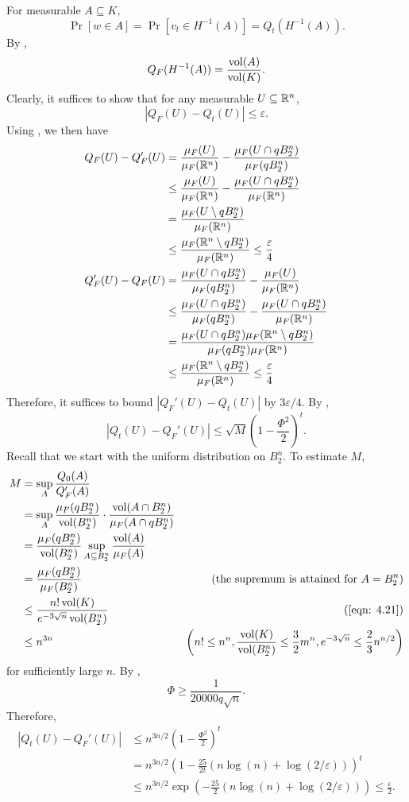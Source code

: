 For measurable $A\subseteq K$,
\[ \Pr[w\in A] = \Pr[v_t \in H^{-1}(A)] = Q_t(H^{-1}(A)). \]
By ,
\[ Q_F(H^{-1}(A)) = \frac{\operatorname{vol}(A)}{\operatorname{vol}(K)}. \]
Clearly, it suffices to show that for any measurable $U\subseteq\mathbb{R}^n$,
\[ |Q_F(U) - Q_t(U)| \leq \varepsilon. \]
Using , we then have
\begin{align*}
	Q_F(U) - Q_F'(U) &= \frac{\mu_F(U)}{\mu_F(\mathbb{R}^n)} - \frac{\mu_F(U\cap q B_2^n)}{\mu_F(q B_2^n)}  \\
		&\leq \frac{\mu_F(U)}{\mu_F(\mathbb{R}^n)} - \frac{\mu_F(U\cap q B_2^n)}{\mu_F(\mathbb{R}^n)} \\
		&= \frac{\mu_F(U\setminus qB_2^n)}{\mu_F(\mathbb{R}^n)} \\
		&\leq \frac{\mu_F(\mathbb{R}^n\setminus qB_2^n)}{\mu_F(\mathbb{R}^n)} \leq \frac{\varepsilon}{4} \\
	Q_F'(U) - Q_F(U) &= \frac{\mu_F(U\cap q B_2^n)}{\mu_F(q B_2^n)} - \frac{\mu_F(U)}{\mu_F(\mathbb{R}^n)} \\
		&\leq \frac{\mu_F(U\cap q B_2^n)}{\mu_F(qB_2^n)} - \frac{\mu_F(U\cap q B_2^n)}{\mu_F(\mathbb{R}^n)} \\
		&= \frac{\mu_F(U\cap q B_2^n)\mu_F(\mathbb{R}^n\setminus qB_2^n)}{\mu_F(qB_2^n)\mu_F(\mathbb{R}^n)} \\
		&\leq \frac{\mu_F(\mathbb{R}^n\setminus qB_2^n)}{\mu_F(\mathbb{R}^n)} \leq \frac{\varepsilon}{4}
\end{align*}
Therefore, it suffices to bound $|Q_F'(U)-Q_t(U)|$ by $3\varepsilon/4$. By ,
\[ |Q_t(U) - Q_F'(U)| \leq \sqrt{M}\left(1-\frac{\Phi^2}{2}\right)^t. \]
Recall that we start with the uniform distribution on $B_2^n$. To estimate $M$,
\begin{align*}
	M 	&= \sup_{A} \frac{Q_0(A)}{Q_F'(A)} \\
		&= \sup_{A} \frac{\mu_F(q B_2^n)}{\vol(B_2^n)}\cdot\frac{\vol(A\cap B_2^n)}{\mu_F(A\cap q B_2^n)} \\
		&= \frac{\mu_F(q B_2^n)}{\vol(B_2^n)} \sup_{A\subseteq B_2^n}\frac{\vol(A)}{\mu_F(A)} \\
		&= \frac{\mu_F(q B_2^n)}{\mu_F(B_2^n)} & (\text{the supremum is attained for }A=B_2^n) \\
		&\leq \frac{n!\vol(K)}{e^{-3\sqrt{n}}\vol(B_2^n)} & (\text{\Cref{eqn: 4.21}}) \\
		&\leq n^{3n} & \left(n!\leq n^n, \frac{\vol(K)}{\vol(B_2^n)} \leq \frac{3}{2}m^n, e^{-3\sqrt{n}}\leq\frac{2}{3}n^{n/2}\right)
\end{align*}
for sufficiently large $n$. By ,
\[ \Phi \geq \frac{1}{20000q\sqrt{n}}. \]
Therefore,
\begin{align*}
	|Q_t(U) - Q_F'(U)| &\leq n^{3n/2}\left(1-\frac{\Phi^2}{2}\right)^t \\
		&= n^{3n/2} \left(1 - \frac{25}{2t} \left(n\log(n) + \log(2/\varepsilon)\right)\right)^t \\
		&\leq n^{3n/2} \exp\left(-\frac{25}{2}\left(n\log(n) + \log(2/\varepsilon)\right)\right) \leq \frac{\varepsilon}{2}.
\end{align*}

